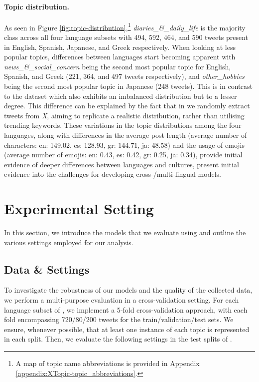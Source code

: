 \paragraph{Topic distribution.} As seen in Figure \ref{fig:topic-distribution},\footnote{A map of topic name abbreviations is provided in Appendix \ref{appendix:XTopic-topic_abbreviations}.} \textit{diaries\_\&\_daily\_life} is the majority class across all four language subsets with 494, 592, 464, and 590 tweets present in English, Spanish, Japanese, and Greek respectively. When looking at less popular topics, differences between languages start becoming apparent with \textit{news\_\&\_social\_concern} being the second most popular topic for English, Spanish, and Greek (221, 364, and 497 tweets respectively), and \textit{other\_hobbies} being the second most popular topic in Japanese (248 tweets). This is in contrast to the {\TweetTopic} dataset which also exhibits an imbalanced distribution but to a lesser degree. This difference can be explained by the fact that in {\XTOPIC} we randomly extract tweets from \textit{X}, aiming to replicate a realistic distribution, rather than utilising trending keywords. These variations in the topic distributions among the four languages, along with differences in the average post length (average number of characters: en: 149.02, es: 128.93, gr: 144.71, ja: 48.58) and the usage of emojis (average number of emojis: en: 0.43, es: 0.42, gr: 0.25, ja: 0.34), provide initial evidence of deeper differences between languages and cultures, present initial evidence into the challenges for developing cross-/multi-lingual models.

\section{Experimental Setting}
In this section, we introduce the models that we evaluate using {\XTOPIC} and outline the various settings employed for our analysis.

\subsection{Data \& Settings}
\label{sec:settings}
To investigate the robustness of our models and the quality of the collected data, we perform a multi-purpose evaluation in a cross-validation setting. For each language subset of {\XTOPIC}, we implement a 5-fold cross-validation approach, with each fold encompassing 720/80/200 tweets for the train/validation/test sets. We ensure, whenever possible, that at least one instance of each topic is represented in each split. Then, we evaluate the following settings in the test splits of {\XTOPIC}.


